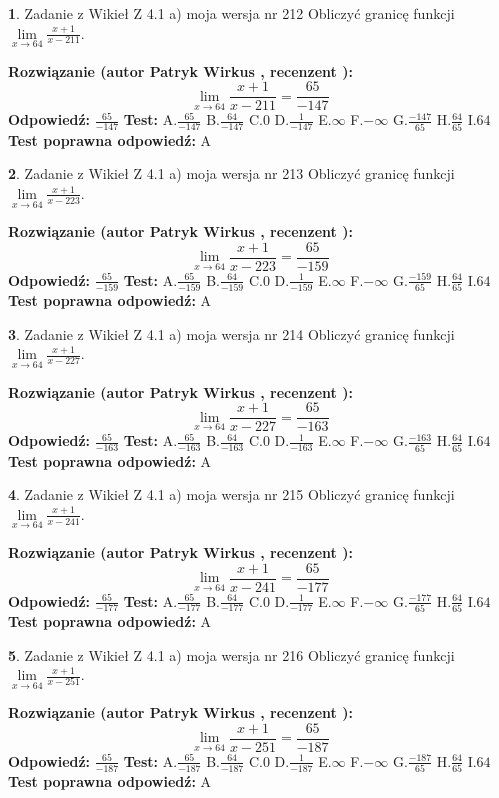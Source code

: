 \documentclass[12pt, a4paper]{article}
\theoremstyle{definition} %
\newtheorem{zad}{}
\newcommand{\zadStart}[1]{\begin{zad}#1\newline}
\newcommand{\zadStop}{\end{zad}}
\newcommand{\rozwStart}[2]{\noindent \textbf{Rozwiązanie (autor #1 , recenzent #2): }\newline}
\newcommand{\rozwStop}{\newline}
\newcommand{\odpStart}{\noindent \textbf{Odpowiedź:}\newline}
\newcommand{\odpStop}{\newline}
\newcommand{\testStart}{\noindent \textbf{Test:}\newline}
\newcommand{\testStop}{\newline}
\newcommand{\kluczStart}{\noindent \textbf{Test poprawna odpowiedź:}\newline}
\newcommand{\kluczStop}{\newline}
\begin{document}
\zadStart{Zadanie z Wikieł Z 4.1 a) moja wersja nr 212}
Obliczyć granicę funkcji $\lim\limits_{x\to64}\frac{x+1}{x-211}$.
\zadStop
\rozwStart{Patryk Wirkus}{}
$$\lim\limits_{x\to64}\frac{x+1}{x-211} = \frac{65}{-147}$$
\rozwStop
\odpStart
$\frac{65}{-147}$
\odpStop
\testStart
A.$\frac{65}{-147}$
B.$\frac{64}{-147}$
C.$0$
D.$\frac{1}{-147}$
E.$\infty$
F.$-\infty$
G.$\frac{-147}{65}$
H.$\frac{64}{65}$
I.$64$
\testStop
\kluczStart
A
\kluczStop



\zadStart{Zadanie z Wikieł Z 4.1 a) moja wersja nr 213}
Obliczyć granicę funkcji $\lim\limits_{x\to64}\frac{x+1}{x-223}$.
\zadStop
\rozwStart{Patryk Wirkus}{}
$$\lim\limits_{x\to64}\frac{x+1}{x-223} = \frac{65}{-159}$$
\rozwStop
\odpStart
$\frac{65}{-159}$
\odpStop
\testStart
A.$\frac{65}{-159}$
B.$\frac{64}{-159}$
C.$0$
D.$\frac{1}{-159}$
E.$\infty$
F.$-\infty$
G.$\frac{-159}{65}$
H.$\frac{64}{65}$
I.$64$
\testStop
\kluczStart
A
\kluczStop



\zadStart{Zadanie z Wikieł Z 4.1 a) moja wersja nr 214}
Obliczyć granicę funkcji $\lim\limits_{x\to64}\frac{x+1}{x-227}$.
\zadStop
\rozwStart{Patryk Wirkus}{}
$$\lim\limits_{x\to64}\frac{x+1}{x-227} = \frac{65}{-163}$$
\rozwStop
\odpStart
$\frac{65}{-163}$
\odpStop
\testStart
A.$\frac{65}{-163}$
B.$\frac{64}{-163}$
C.$0$
D.$\frac{1}{-163}$
E.$\infty$
F.$-\infty$
G.$\frac{-163}{65}$
H.$\frac{64}{65}$
I.$64$
\testStop
\kluczStart
A
\kluczStop



\zadStart{Zadanie z Wikieł Z 4.1 a) moja wersja nr 215}
Obliczyć granicę funkcji $\lim\limits_{x\to64}\frac{x+1}{x-241}$.
\zadStop
\rozwStart{Patryk Wirkus}{}
$$\lim\limits_{x\to64}\frac{x+1}{x-241} = \frac{65}{-177}$$
\rozwStop
\odpStart
$\frac{65}{-177}$
\odpStop
\testStart
A.$\frac{65}{-177}$
B.$\frac{64}{-177}$
C.$0$
D.$\frac{1}{-177}$
E.$\infty$
F.$-\infty$
G.$\frac{-177}{65}$
H.$\frac{64}{65}$
I.$64$
\testStop
\kluczStart
A
\kluczStop



\zadStart{Zadanie z Wikieł Z 4.1 a) moja wersja nr 216}
Obliczyć granicę funkcji $\lim\limits_{x\to64}\frac{x+1}{x-251}$.
\zadStop
\rozwStart{Patryk Wirkus}{}
$$\lim\limits_{x\to64}\frac{x+1}{x-251} = \frac{65}{-187}$$
\rozwStop
\odpStart
$\frac{65}{-187}$
\odpStop
\testStart
A.$\frac{65}{-187}$
B.$\frac{64}{-187}$
C.$0$
D.$\frac{1}{-187}$
E.$\infty$
F.$-\infty$
G.$\frac{-187}{65}$
H.$\frac{64}{65}$
I.$64$
\testStop
\kluczStart
A
\kluczStop
\end{document}

